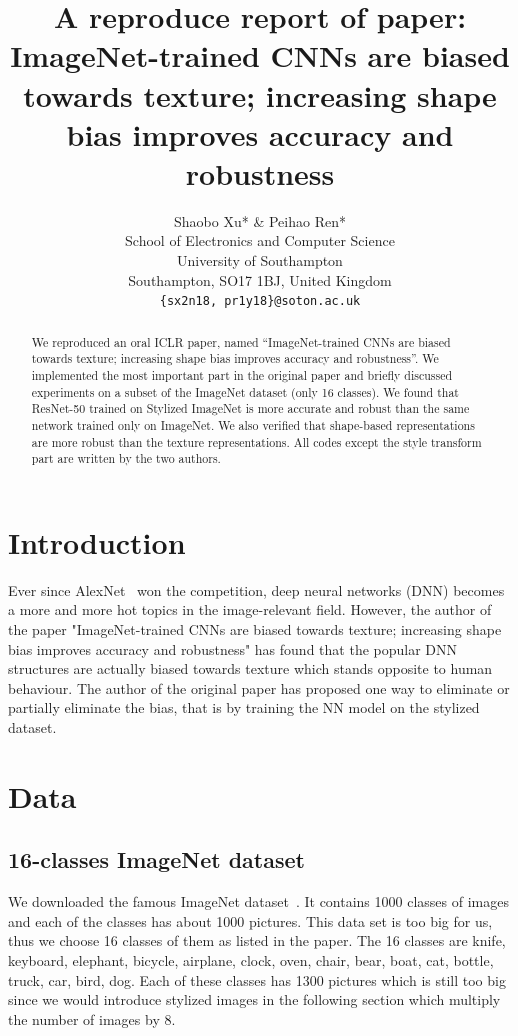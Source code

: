 \documentclass{article} %
\title{A reproduce report of paper: \\ 
ImageNet-trained CNNs are biased towards texture; increasing shape bias improves accuracy and robustness}
\author{Shaobo Xu* \& Peihao Ren*  \\
School of Electronics and Computer Science\\
University of Southampton\\
Southampton, SO17 1BJ, United Kingdom\\
\texttt{\{sx2n18, pr1y18\}@soton.ac.uk} \\
}
\begin{document}
\maketitle

\begin{abstract}

We reproduced an oral ICLR paper, named ``ImageNet-trained CNNs are biased towards texture; increasing shape bias improves accuracy and robustness''. We implemented the most important part in the original paper and briefly discussed  experiments on a subset of the ImageNet dataset (only 16 classes). 
We found that ResNet-50 trained on Stylized ImageNet is more accurate and robust than the same network trained only on ImageNet. We also verified that shape-based representations are more robust than the texture representations.
All codes except the style transform part are written by the two authors.

\end{abstract}

\section{Introduction}

Ever since AlexNet~\cite{krizhevsky2012imagenet} won the competition, deep neural networks (DNN) becomes a more and more hot topics in the image-relevant field. However, the author of the paper "ImageNet-trained CNNs are biased towards texture; increasing shape bias improves accuracy and robustness" has found that the popular DNN structures are actually biased towards texture which stands opposite to human behaviour. The author of the original paper has proposed one way to eliminate or partially eliminate the bias, that is by training the NN model on the stylized dataset. 

\section{Data}

\subsection{16-classes ImageNet dataset}
We downloaded the famous ImageNet dataset~\cite{deng2009imagenet}. It contains 1000 classes of images and each of the classes has about 1000 pictures. This data set is too big for us, thus we choose 16 classes of them as listed in the paper. The 16 classes are knife, keyboard, elephant, bicycle, airplane, clock, oven, chair, bear, boat, cat, bottle, truck, car, bird, dog. Each of these classes has 1300 pictures which is still too big since we would introduce stylized images in the following section which multiply the number of images by 8.
\end{document}
